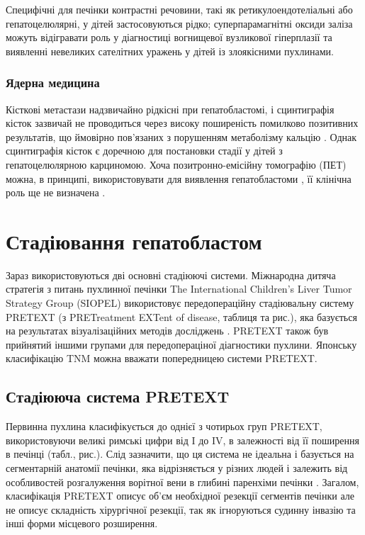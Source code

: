 Специфічні для печінки контрастні речовини, такі як ретикулоендотеліальні або гепатоцелюлярні, у дітей застосовуються рідко; суперпарамагнітні оксиди заліза можуть відігравати роль у діагностиці вогнищевої вузликової гіперплазії та виявленні невеликих сателітних уражень у дітей із злоякісними пухлинами.

\subsubsection{Ядерна медицина} 

Кісткові метастази надзвичайно рідкісні при гепатобластомі, і сцинтиграфія кісток зазвичай не проводиться через високу поширеність помилково позитивних результатів, що ймовірно пов'язаних з порушенням метаболізму кальцію \cite{pmid20345611}. Однак сцинтиграфія кісток є доречною для постановки стадії у дітей з гепатоцелюлярною карциномою.
Хоча позитронно-емісійну томографію (ПЕТ) можна, в принципі, використовувати для виявлення гепатобластоми \cite{pmid20406943}, її клінічна роль ще не визначена \cite{pmid20438949}.

\section{Стадіювання гепатобластом}
Зараз використовуються дві основні стадіюючі системи. Міжнародна дитяча стратегія з питань пухлинної печінки The International Children’s Liver Tumor Strategy Group (SIOPEL) використовує передопераційну стадіювальну систему PRETEXT (з PRETreatment EXTent of disease, таблиця  та рис.), яка базується на результатах візуалізаційних методів досліджень \cite{pmid22702740}. PRETEXT також був прийнятий іншими групами для передопераціної діагностики пухлини. Японську класифікацію TNM \cite{pmid22760493} можна вважати попередницею системи PRETEXT.

\subsection{Стадіююча система PRETEXT}
Первинна пухлина класифікується до однієї з чотирьох груп PRETEXT, використовуючи великі римські цифри від I до IV, в залежності від її поширення в печінці (табл., рис.). Слід зазначити, що ця система не ідеальна і базується на сегментарній анатомії печінки, яка відрізняється у різних людей і залежить від особливостей розгалуження ворітної вени в глибині паренхіми печінки \cite{pmid22760520}. Загалом, класифікація PRETEXT описує об’єм необхідної резекції сегментів печінки але не описує складність хірургічної резекції, так як ігноруються судинну інвазію та інші форми місцевого розширення.

